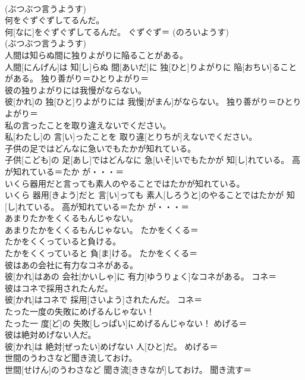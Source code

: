\documentclass[8pt]{extreport}
\begin{document}
\begin{CJK}{UTF8}{min}
{\\	(ぶつぶつ言うようす)
\\	何をぐずぐずしてるんだ。	
\\	何[なに]をぐずぐずしてるんだ。	ぐずぐず＝ (のろいようす) 
\\	(ぶつぶつ言うようす)
\\	人間は知らぬ間に独りよがりに陥ることがある。	
\\	人間[にんげん]は 知[し]らぬ 間[あいだ]に 独[ひと]りよがりに 陥[おちい]ることがある。	独り善がり＝ひとりよがり＝ 
\\	彼の独りよがりには我慢がならない。	
\\	彼[かれ]の 独[ひと]りよがりには 我慢[がまん]がならない。	独り善がり＝ひとりよがり＝ 
\\	私の言ったことを取り違えないでください。	
\\	私[わたし]の 言[い]ったことを 取り違[とりちが]えないでください。	
\\	子供の足ではどんなに急いでもたかが知れている。	
\\	子供[こども]の 足[あし]ではどんなに 急[いそ]いでもたかが 知[し]れている。	高が知れている＝たか が・・・＝ 
\\	いくら器用だと言っても素人のやることではたかが知れている。	
\\	いくら 器用[きよう]だと 言[い]っても 素人[しろうと]のやることではたかが 知[し]れている。	高が知れている＝たか が・・・＝ 
\\	あまりたかをくくるもんじゃない。	
\\	あまりたかをくくるもんじゃない。	たかをくくる＝ 
\\	たかをくくっていると負ける。	
\\	たかをくくっていると 負[ま]ける。	たかをくくる＝ 
\\	彼はあの会社に有力なコネがある。	
\\	彼[かれ]はあの 会社[かいしゃ]に 有力[ゆうりょく]なコネがある。	コネ＝ 
\\	彼はコネで採用されたんだ。	
\\	彼[かれ]はコネで 採用[さいよう]されたんだ。	コネ＝ 
\\	たった一度の失敗にめげるんじゃない！	
\\	たった一 度[ど]の 失敗[しっぱい]にめげるんじゃない！	めげる＝ 
\\	彼は絶対めげない人だ。	
\\	彼[かれ]は 絶対[ぜったい]めげない 人[ひと]だ。	めげる＝ 
\\	世間のうわさなど聞き流しておけ。	
\\	世間[せけん]のうわさなど 聞き流[ききなが]しておけ。	聞き流す＝ 
}
\end{CJK}
\end{document}
